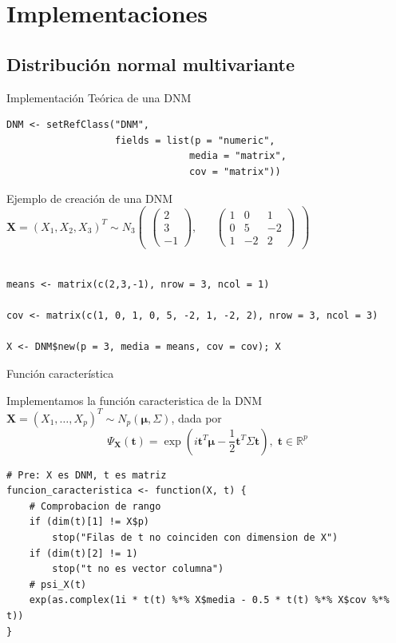 \documentclass[xcolor=table]{beamer}
\begin{document}
\section{Implementaciones}
\subsection{Distribución normal multivariante}
\begin{frame}[fragile]{Implementación Teórica de una DNM}

\begin{lstlisting}
DNM <- setRefClass("DNM", 
                   fields = list(p = "numeric", 
                                media = "matrix", 
                                cov = "matrix"))
\end{lstlisting}
\end{frame}


\begin{frame}[fragile]{Ejemplo de creación de una DNM}
$\pmb{X} = (X_1, X_2, X_3)^T \sim N_3 \begin{pmatrix} \begin{pmatrix} 2 \\ 3 \\ -1 \end{pmatrix}, && \begin{pmatrix} 1 & 0 & 1 \\ 0 & 5 & -2 \\ 1 & -2 & 2 \end{pmatrix} \end{pmatrix} $

\begin{lstlisting}

means <- matrix(c(2,3,-1), nrow = 3, ncol = 1)

cov <- matrix(c(1, 0, 1, 0, 5, -2, 1, -2, 2), nrow = 3, ncol = 3)

X <- DNM$new(p = 3, media = means, cov = cov); X

\end{lstlisting}
\end{frame}

\begin{frame}[fragile]{Función característica}

Implementamos la función caracteristica de la DNM $\pmb{X} = (X_1, \ldots, X_p)^T \sim N_p(\pmb{\mu}, \Sigma)$, dada por $$ \Psi_{\pmb{X}} (\pmb{t}) = \exp\left(i \pmb{t}^T \pmb{\mu} - \frac{1}{2} \pmb{t}^T \Sigma \pmb{t}\right), \; \pmb{t} \in \mathbb{R}^p $$

\scriptsize
  \begin{lstlisting}
# Pre: X es DNM, t es matriz
funcion_caracteristica <- function(X, t) {
    # Comprobacion de rango
    if (dim(t)[1] != X$p)
        stop("Filas de t no coinciden con dimension de X")
    if (dim(t)[2] != 1)
        stop("t no es vector columna")
    # psi_X(t)
    exp(as.complex(1i * t(t) %*% X$media - 0.5 * t(t) %*% X$cov %*% t))
}
  \end{lstlisting}
\end{frame}
\end{document}
